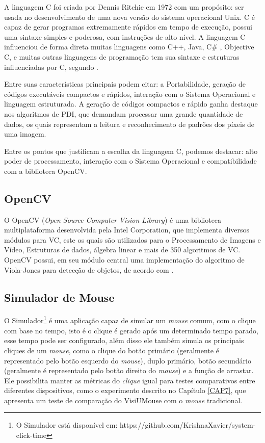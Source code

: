 A linguagem C foi criada por Dennis Ritchie em 1972 com um propósito: ser usada no desenvolvimento de uma nova versão do sistema operacional Unix. C é capaz de gerar programas extremamente rápidos em tempo de execução, possui uma sintaxe simples e poderosa, com instruções de alto nível. A linguagem C influenciou de forma direta muitas linguagens como C++, Java, C\# , Objective C, e muitas outras linguagens de programação tem sua sintaxe e estruturas influenciadas por C, segundo .

Entre suas características principais podem citar: a Portabilidade, geração de códigos executáveis compactos e rápidos, interação com o Sistema Operacional e linguagem estruturada. A geração de códigos compactos e rápido ganha destaque nos algoritmos de PDI, que demandam processar uma grande quantidade de dados, os quais representam a leitura e reconhecimento de padrões dos píxeis de uma imagem.

Entre os pontos que justificam a escolha da linguagem C, podemos destacar: alto poder de processamento, interação com o Sistema Operacional e compatibilidade com a biblioteca OpenCV.

\subsection{OpenCV}

O OpenCV (\textit{Open Source Computer Vision Library}) é uma biblioteca multiplataforma desenvolvida pela Intel Corporation, que implementa diversos módulos para VC, este os quais são utilizados para o Processamento de Imagens e Vídeo, Estruturas de dados, álgebra linear e mais de 350 algoritmos de VC. OpenCV possui, em seu módulo central uma implementação do algoritmo de Viola-Jones para detecção de objetos, de acordo com \cite{bradski2008learning}.

\subsection{Simulador de Mouse}

O Simulador\footnote{O Simulador está disponível em: https://github.com/KrishnaXavier/system-click-time} é uma aplicação capaz de simular um \textit{mouse} comum, com o clique com base no tempo, isto é o clique é gerado após um determinado tempo parado, esse tempo pode ser configurado, além disso ele também simula os principais cliques de um \textit{mouse}, como o clique do botão primário (geralmente é representado pelo botão esquerdo do \textit{mouse}), duplo primário, botão secundário (geralmente é representado pelo botão direito do \textit{mouse}) e a função de arrastar. Ele possibilita manter as métricas do \textit{clique} igual para testes comparativos entre diferentes dispositivos, como o experimento descrito no Capítulo \ref{CAP7}, que apresenta um teste de comparação do VisiUMouse com o \textit{mouse} tradicional.



